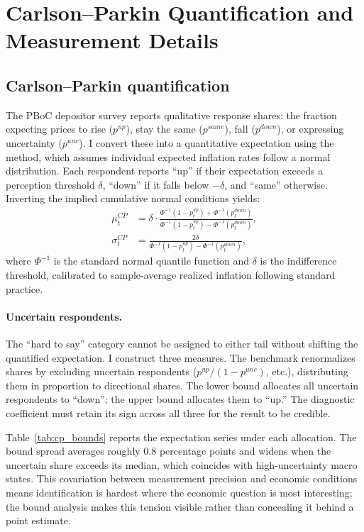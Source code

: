 \section{Carlson--Parkin Quantification and Measurement Details}\label{app:measurement}

\subsection{Carlson--Parkin quantification}

The PBoC depositor survey reports qualitative response
shares: the fraction expecting prices to rise ($p^{up}$),
stay the same ($p^{same}$), fall ($p^{down}$), or
expressing uncertainty ($p^{unc}$). I convert these into
a quantitative expectation using the \citet{Carlson1975}
method, which assumes individual expected inflation rates
follow a normal distribution. Each respondent reports
``up'' if their expectation exceeds a perception threshold
$\delta$, ``down'' if it falls below $-\delta$, and
``same'' otherwise. Inverting the implied cumulative
normal conditions yields:
\begin{align}
  \mu_t^{CP} &= \delta \cdot
    \frac{\Phi^{-1}(1 - p_t^{up}) +
          \Phi^{-1}(p_t^{down})}
         {\Phi^{-1}(1 - p_t^{up}) -
          \Phi^{-1}(p_t^{down})}, \label{eq:cp_mean} \\
  \sigma_t^{CP} &= \frac{2\delta}
    {\Phi^{-1}(1 - p_t^{up}) -
     \Phi^{-1}(p_t^{down})}, \label{eq:cp_sd}
\end{align}
where $\Phi^{-1}$ is the standard normal quantile function
and $\delta$ is the indifference threshold, calibrated to
sample-average realized inflation following standard
practice.

\paragraph{Uncertain respondents.}
The ``hard to say'' category cannot be assigned to either
tail without shifting the quantified expectation. I
construct three measures. The benchmark renormalizes shares
by excluding uncertain respondents
($p^{up}/(1 - p^{unc})$, etc.), distributing them in
proportion to directional shares. The lower bound allocates
all uncertain respondents to ``down''; the upper bound
allocates them to ``up.'' The diagnostic coefficient must
retain its sign across all three for the result to be
credible.

Table~\ref{tab:cp_bounds} reports the expectation series
under each allocation. The bound spread averages roughly
0.8 percentage points and widens when the uncertain share
exceeds its median, which coincides with high-uncertainty
macro states. This covariation between measurement
precision and economic conditions means identification is
hardest where the economic question is most interesting;
the bound analysis makes this tension visible rather than
concealing it behind a point estimate.

